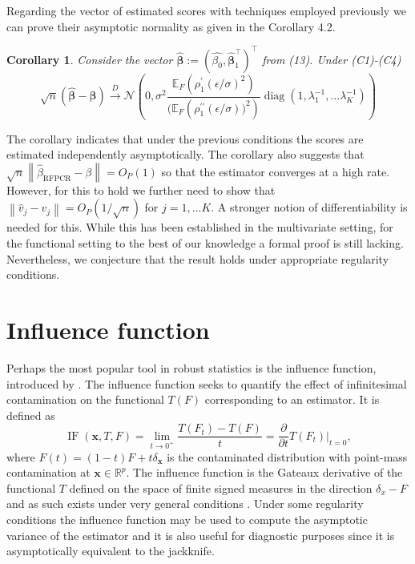 \documentclass[11pt]{article}
\newtheorem{cor}{Corollary}[section]
\DeclareMathOperator{\IF}{IF}
\DeclareMathOperator{\diag}{diag}
\begin{document}
Regarding the vector of estimated scores with techniques employed previously we can prove their asymptotic normality as given in the Corollary 4.2. 
\begin{cor}
Consider the vector $\widehat{\boldsymbol{\beta}} := \left( \widehat{\beta_0}, \widehat{\boldsymbol{\beta}}_1^{\top} \right)^{\top}$ from (13). Under (C1)-(C4)
\begin{equation*}
\sqrt{n}(\widehat{\boldsymbol{\beta}} - \boldsymbol{\beta} ) \xrightarrow{D} \mathcal{N}\left(0,  \sigma^2 \frac{\mathbb{E}_F \left( \rho_{1}^{\prime}(\epsilon/ \sigma)^2 \right)}{(\mathbb{E}_F \left( \rho_1^{\prime \prime}(\epsilon/\sigma))^2 \right) } \diag\left(1, \lambda_1^{-1}, \ldots \lambda_K^{-1} \right) \right)
\end{equation*}
\end{cor} 
\noindent
The corollary indicates that under the previous conditions the scores are estimated independently asymptotically. The corollary also suggests that $\sqrt{n} \left\| \hat{\beta}_{{\scriptscriptstyle \text{RFPCR}}} - \beta \right\| = O_P(1)$ so that the estimator converges at a high rate. However, for this to hold we further need to show that $\left\|\widehat{v}_j - v_j \right\| = O_P(1/\sqrt{n})$ for $j=1, \ldots K$. A stronger notion of differentiability is needed for this. While this has been established in the multivariate setting, for the functional setting to the best of our knowledge a formal proof is still lacking. Nevertheless, we conjecture that the result holds under appropriate regularity conditions.
	
\section{Influence function}

Perhaps the most popular tool in robust statistics is the influence function, introduced by \cite{hampel1974influence}. The influence function seeks to quantify the effect of infinitesimal contamination on the functional $T(F)$ corresponding to an estimator. It is defined as
\begin{equation}
\IF\left(\mathbf{x}, T, F\right) = \lim_{t \to 0^{+} } \frac{T\left(F_t\right)-T(F)}{t} = \frac{\partial}{\partial t} T\left(F_t \right) \Big\rvert_{t = 0},
\end{equation}
where $F(t) = \left(1-t\right)F + t \delta_\mathbf{x}$ is the contaminated distribution with point-mass contamination at $\mathbf{x} \in \mathbb{R}^p$. The influence function is the Gateaux derivative of the functional $T$ defined on the space of finite signed measures in the direction $\delta_x - F$ and as such exists under very general conditions \citep{hampel2011robust}. Under some regularity conditions the influence function may be used to compute the asymptotic variance of the estimator and it is also useful for diagnostic purposes since it is asymptotically equivalent to the jackknife.
\end{document}
